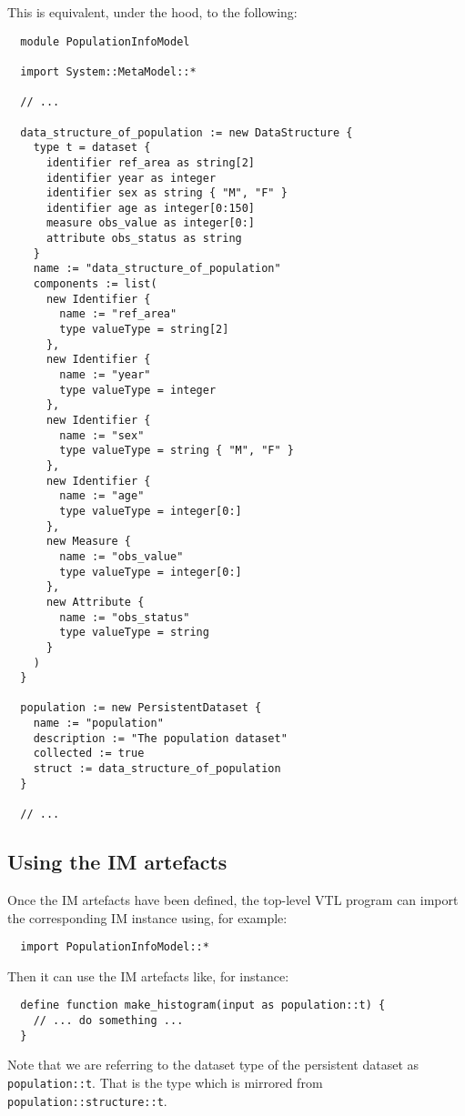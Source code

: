 \documentclass[droidmono,libertine,twoside,user,unofficial]{ecarticle}
\begin{document}
This is equivalent, under the hood, to the following:

\begin{lstlisting}
  module PopulationInfoModel

  import System::MetaModel::*

  // ...

  data_structure_of_population := new DataStructure {
    type t = dataset {
      identifier ref_area as string[2]
      identifier year as integer
      identifier sex as string { "M", "F" }
      identifier age as integer[0:150]
      measure obs_value as integer[0:]
      attribute obs_status as string
    }
    name := "data_structure_of_population"
    components := list(
      new Identifier {
        name := "ref_area"
        type valueType = string[2]
      },
      new Identifier {
        name := "year"
        type valueType = integer
      },
      new Identifier {
        name := "sex"
        type valueType = string { "M", "F" }
      },
      new Identifier {
        name := "age"
        type valueType = integer[0:]
      },
      new Measure {
        name := "obs_value"
        type valueType = integer[0:]
      },
      new Attribute {
        name := "obs_status"
        type valueType = string
      }
    ) 
  }
  
  population := new PersistentDataset {
    name := "population"
    description := "The population dataset"
    collected := true
    struct := data_structure_of_population
  }

  // ...
\end{lstlisting}

\subsection{Using the IM artefacts}

Once the IM artefacts have been defined, the top-level VTL program can
import the corresponding IM instance using, for example:
\begin{lstlisting}
  import PopulationInfoModel::*
\end{lstlisting}

Then it can use the IM artefacts like, for instance:
\begin{lstlisting}
  define function make_histogram(input as population::t) {
    // ... do something ...
  }
\end{lstlisting}

Note that we are referring to the dataset type of the persistent
dataset as \texttt{population::t}.  That is the type which is mirrored
from \texttt{population::structure::t}.
\end{document}
